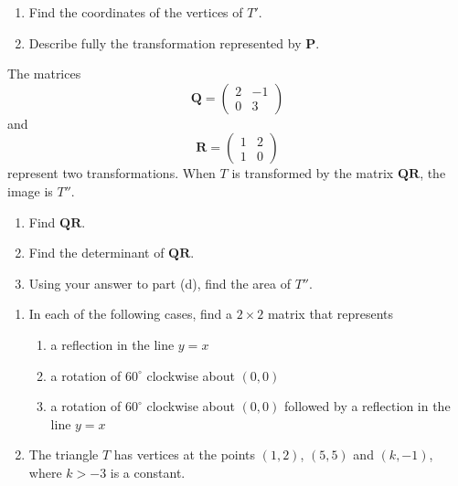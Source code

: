 \documentclass[leqno]{article}
\begin{document}
\begin{enumerate}[
  label=\textbf{\arabic*.},
  leftmargin=*,
  topsep=0pt,
  partopsep=0pt,
  parsep=0pt
]
\begin{enumerate}[label=\textbf{(\alph*)}]
  \item Find the coordinates of the vertices of $T'$.  \\
  \item Describe fully the transformation represented by $\mathbf{P}$.  \\
\end{enumerate}

The matrices
\[
\mathbf{Q} = \begin{pmatrix} 2 & -1 \\ 0 & 3 \end{pmatrix}
\]
and
\[
\mathbf{R} = \begin{pmatrix} 1 & 2 \\ 1 & 0 \end{pmatrix}
\]
represent two transformations. When $T$ is transformed by the matrix $\mathbf{QR}$, the image is $T''$. \\

\begin{enumerate}[label=\textbf{(\alph*)}, resume]
  \item Find $\mathbf{QR}$.  \\
  \item Find the determinant of $\mathbf{QR}$.  \\
  \item Using your answer to part (d), find the area of $T''$.  \\
\end{enumerate}

\newpage

\questionitem

\begin{enumerate}[label=\textbf{(\roman*)}]
  \item In each of the following cases, find a $2\times 2$ matrix that represents
  \begin{enumerate}[label=(\alph*)]
    \item a reflection in the line $y=x$ 
    \item a rotation of $60^\circ$ clockwise about $(0,0)$ 
    \item a rotation of $60^\circ$ clockwise about $(0,0)$ followed by a reflection in the line $y=x$  \\
  \end{enumerate}
  \item The triangle $T$ has vertices at the points $(1,2)$, $(5,5)$ and $(k,-1)$, where $k>-3$ is a constant. \\


\end{enumerate}
\end{enumerate}
\end{document}
